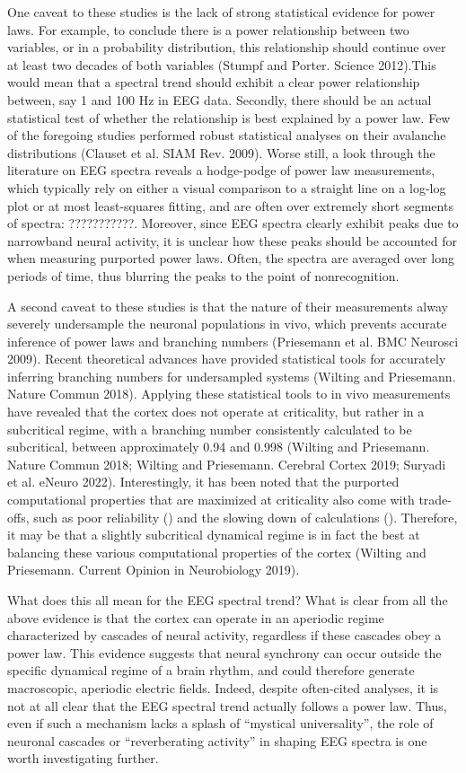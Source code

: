 One caveat to these studies is the lack of strong statistical evidence for power laws. For example, to conclude there is a power relationship between two variables, or in a probability distribution, this relationship should continue over at least two decades of both variables (Stumpf and Porter. Science 2012).This would mean that a spectral trend should exhibit a clear power relationship between, say 1 and 100 Hz in EEG data. Secondly, there should be an actual statistical test of whether the relationship is best explained by a power law. Few of the foregoing studies performed robust statistical analyses on their avalanche distributions (Clauset et al. SIAM Rev. 2009). Worse still, a look through the literature on EEG spectra reveals a hodge-podge of power law measurements, which typically rely on either a visual comparison to a straight line on a log-log plot or at most least-squares fitting, and are often over extremely short segments of spectra: ???????????. Moreover, since EEG spectra clearly exhibit peaks due to narrowband neural activity, it is unclear how these peaks should be accounted for when measuring purported power laws. Often, the spectra are averaged over long periods of time, thus blurring the peaks to the point of nonrecognition.

A second caveat to these studies is that the nature of their measurements alway severely undersample the neuronal populations in vivo, which prevents accurate inference of power laws and branching numbers (Priesemann et al. BMC Neurosci 2009). Recent theoretical advances have provided statistical tools for accurately inferring branching numbers for undersampled systems (Wilting and Priesemann. Nature Commun 2018). Applying these statistical tools to in vivo measurements have revealed that the cortex does not operate at criticality, but rather in a subcritical regime, with a branching number consistently calculated to be subcritical, between approximately 0.94 and 0.998 (Wilting and Priesemann. Nature Commun 2018; Wilting and Priesemann. Cerebral Cortex 2019; Suryadi et al. eNeuro 2022). Interestingly, it has been noted that the purported computational properties that are maximized at criticality also come with trade-offs, such as poor reliability () and the slowing down of calculations (). Therefore, it may be that a slightly subcritical dynamical regime is in fact the best at balancing these various computational properties of the cortex (Wilting and Priesemann. Current Opinion in Neurobiology 2019).

What does this all mean for the EEG spectral trend? What is clear from all the above evidence is that the cortex can operate in an aperiodic regime characterized by cascades of neural activity, regardless if these cascades obey a power law. This evidence suggests that neural synchrony can occur outside the specific dynamical regime of a brain rhythm, and could therefore generate macroscopic, aperiodic electric fields. Indeed, despite often-cited analyses, it is not at all clear that the EEG spectral trend actually follows a power law. Thus, even if such a mechanism lacks a splash of “mystical universality”, the role of neuronal cascades or “reverberating activity” in shaping EEG spectra is one worth investigating further. 




